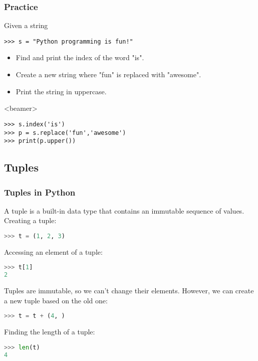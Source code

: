 \begin{frame}[fragile]
  \frametitle{Practice}
  Given a string
  \begin{lstlisting}
>>> s = "Python programming is fun!"
  \end{lstlisting}
  \begin{itemize}
   \item Find and print the index of the word "is".
   \item Create a new string where "fun" is replaced with "awesome".
   \item Print the string in uppercase.
  \end{itemize}
  \begin{onlyenv}<beamer>
    \begin{lstlisting}[]
>>> s.index('is')
>>> p = s.replace('fun','awesome')
>>> print(p.upper())
    \end{lstlisting}
  \end{onlyenv}
 \end{frame}

\subsection{Tuples}
\begin{frame}[fragile]
  \frametitle{Tuples in Python}
  A tuple is a built-in data type that contains an immutable sequence of values. 
  Creating a tuple:
  \begin{lstlisting}[language=Python,numbers=none]
>>> t = (1, 2, 3)
  \end{lstlisting}
  Accessing an element of a tuple:
  \begin{lstlisting}[language=Python,numbers=none]
>>> t[1]
2
  \end{lstlisting}
  Tuples are immutable, so we can't change their elements. However, we can create a new tuple based on the old one:
  \begin{lstlisting}[language=Python,numbers=none]
>>> t = t + (4, )
  \end{lstlisting}
  Finding the length of a tuple:
  \begin{lstlisting}[language=Python,numbers=none]
>>> len(t)
4
  \end{lstlisting}
\end{frame}

